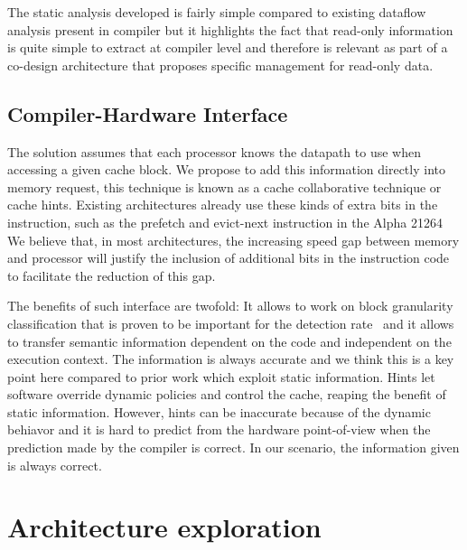 \documentclass[sigconf]{acmart}
\begin{document}
The static analysis developed is fairly simple compared to existing dataflow analysis present in compiler but it highlights the fact that read-only information is quite simple to extract at compiler level and therefore is relevant as part of a co-design architecture that proposes specific management for read-only data. 

\subsection{Compiler-Hardware Interface}

The solution assumes that each processor knows the datapath to use when accessing a given cache block. We propose to add this information directly into memory request, this technique is known as a cache collaborative technique or cache hints. Existing architectures already use these kinds of extra bits in the instruction, such as the prefetch and evict-next instruction in the Alpha 21264 We believe that, in most architectures, the increasing speed gap between memory and processor will justify the inclusion of additional bits in the instruction code to facilitate the reduction of this gap.

The benefits of such interface are twofold: It allows to work on block granularity classification that is proven to be important for the detection rate~\cite{Davari:2015} and it allows to transfer semantic information dependent on the code and independent on the execution context. The information is always accurate and we think this is a key point here compared to prior work which exploit static information. Hints let software override dynamic policies and control the cache, reaping the benefit of static information. However, hints can be inaccurate because of the dynamic behiavor and it is hard to predict from the hardware point-of-view when the prediction made by the compiler is correct. In our scenario, the information given is always correct.

\section{Architecture exploration}
\end{document}
